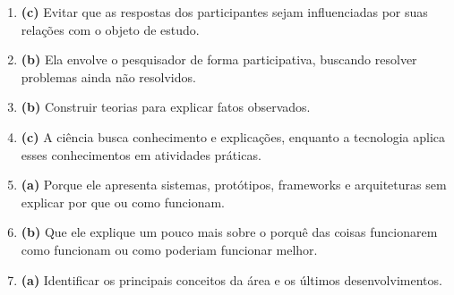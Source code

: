 \documentclass[a4paper,12pt]{article}
\begin{document}
\begin{enumerate}
\item \textbf{(c)} Evitar que as respostas dos participantes sejam influenciadas por suas relações com o objeto de estudo.

\item \textbf{(b)} Ela envolve o pesquisador de forma participativa, buscando resolver problemas ainda não resolvidos.

\item \textbf{(b)} Construir teorias para explicar fatos observados.

\item \textbf{(c)} A ciência busca conhecimento e explicações, enquanto a tecnologia aplica esses conhecimentos em atividades práticas.

\item \textbf{(a)} Porque ele apresenta sistemas, protótipos, frameworks e arquiteturas sem explicar por que ou como funcionam.

\item \textbf{(b)} Que ele explique um pouco mais sobre o porquê das coisas funcionarem como funcionam ou como poderiam funcionar melhor.

\item \textbf{(a)} Identificar os principais conceitos da área e os últimos desenvolvimentos.
    
\end{enumerate}
\end{document}
